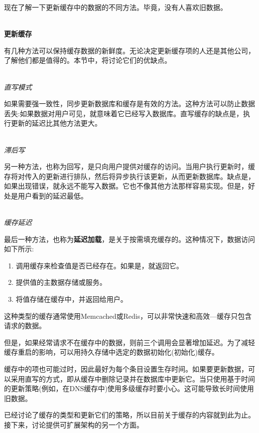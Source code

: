 现在了解一下更新缓存中的数据的不同方法。毕竟，没有人喜欢旧数据。

\hspace*{\fill} \\ %
\noindent
\textbf{更新缓存}

有几种方法可以保持缓存数据的新鲜度。无论决定更新缓存项的人还是其他公司，了解他们都是值得的。本节中，将讨论它们的优缺点。

\hspace*{\fill} \\ %
\noindent
\textit{直写模式}

如果需要强一致性，同步更新数据库和缓存是有效的方法。这种方法可以防止数据丢失:如果数据对用户可见，就意味着它已经写入数据库。直写缓存的缺点是，执行更新的延迟比其他方法更大。

\hspace*{\fill} \\ %
\noindent
\textit{滞后写}

另一种方法，也称为回写，是只向用户提供对缓存的访问。当用户执行更新时，缓存将对传入的更新进行排队，然后将异步执行该更新，从而更新数据库。缺点是，如果出现错误，就永远不能写入数据。它也不像其他方法那样容易实现。但是，好处是用户看到的延迟最低。

\hspace*{\fill} \\ %
\noindent
\textit{缓存延迟}

最后一种方法，也称为\textbf{延迟加载}，是关于按需填充缓存的。这种情况下，数据访问如下所示:

\begin{enumerate}
\item 
调用缓存来检查值是否已经存在。如果是，就返回它。

\item 
提供值的主数据存储或服务。

\item
将值存储在缓存中，并返回给用户。
\end{enumerate}

这种类型的缓存通常使用Memcached或Redis，可以非常快速和高效—缓存只包含请求的数据。

但是，如果经常请求不在缓存中的数据，则前三个调用会显著增加延迟。为了减轻缓存重启的影响，可以用持久存储中选定的数据初始化(初始化)缓存。

缓存中的项也可能过时，因此最好为每个条目设置生存时间。如果要更新数据，可以采用直写的方式，即从缓存中删除记录并在数据库中更新它。当只使用基于时间的更新策略(例如，在DNS缓存中)使用多级缓存时要小心。这可能导致长时间使用旧数据。

已经讨论了缓存的类型和更新它们的策略，所以目前关于缓存的内容就到此为止。接下来，讨论提供可扩展架构的另一个方面。






